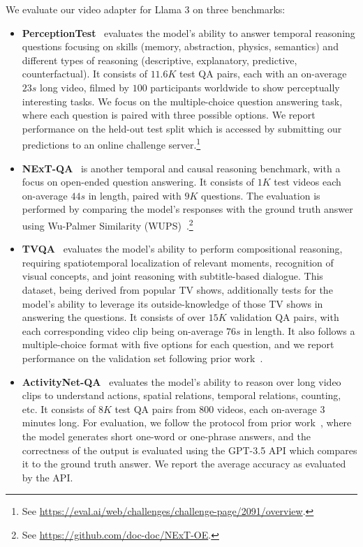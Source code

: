 \documentclass[dvipsnames]{fairmeta}
\begin{document}
We evaluate our video adapter for Llama 3 on three benchmarks:
\begin{itemize}
\item \textbf{PerceptionTest}~\citep{patraucean2023perception} evaluates the model's ability to answer temporal reasoning questions focusing on skills (memory, abstraction, physics, semantics) and different types of reasoning (descriptive, explanatory, predictive, counterfactual). It consists of $11.6K$ test QA pairs, each with an on-average $23s$ long video, filmed by $100$ participants worldwide to show perceptually interesting tasks. We focus on the multiple-choice question answering task, where each question is paired with three possible options. We report performance on the held-out test split which is accessed by submitting our predictions to an online challenge server.\footnote{See \url{https://eval.ai/web/challenges/challenge-page/2091/overview}.}

\item \textbf{NExT-QA}~\citep{xiao2021next} is another temporal and causal reasoning benchmark, with a focus on open-ended question answering.
It consists of $1K$ test videos each on-average $44s$ in length, paired with $9K$ questions. The evaluation is performed by comparing the model's responses with the ground truth answer using Wu-Palmer Similarity (WUPS)~\citep{wu1994verb}.\footnote{See \url{https://github.com/doc-doc/NExT-OE}.}

\item \textbf{TVQA}~\citep{lei2018tvqa} evaluates the model's ability to perform compositional reasoning, requiring spatiotemporal localization of relevant moments, recognition of visual concepts, and joint reasoning with subtitle-based dialogue. This dataset, being derived from popular TV shows, additionally tests for the model's ability to leverage its outside-knowledge of those TV shows in answering the questions. It consists of over $15K$ validation QA pairs, with each corresponding video clip being on-average $76s$ in length. It also follows a multiple-choice format with five options for each question, and we report performance on the validation set following prior work~\citep{openai2023gpt4blog}.

\item \textbf{ActivityNet-QA}~\citep{yu2019activityqa} evaluates the model's ability to reason over long video clips to understand actions, spatial relations, temporal relations, counting, etc. It consists of $8K$ test QA pairs from $800$ videos, each on-average $3$ minutes long. For evaluation, we follow the protocol from prior work~\citep{gemini2023gemini,lin2023video,Maaz2023VideoChatGPT}, where the model generates short one-word or one-phrase answers, and the correctness of the output is evaluated using the GPT-3.5 API which compares it to the ground truth answer. We report the average accuracy as evaluated by the API.
\end{itemize}
\end{document}
